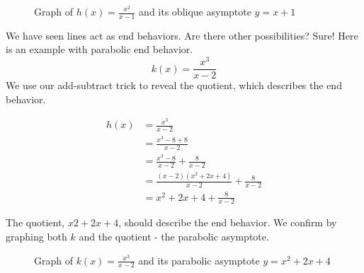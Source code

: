 \begin{figure}[htbp]
  \centering
  \caption{Graph of \( h(x) = \frac{x^2}{x - 1} \) and its oblique asymptote \( y = x + 1 \)}
\end{figure}

We have seen lines act as end behaviors. Are there other possibilities? Sure! Here is an example with parabolic end behavior. 
\[ k(x) = \frac{x^3}{x - 2} \]
We use our add-subtract trick to reveal the quotient, which describes the end behavior.

\begin{equation} \label{eq1}
\begin{split}
h(x) & = \frac{x^3}{x - 2} \\
& = \frac{x^3 - 8 + 8}{x - 2} \\ 
& = \frac{x^3 - 8}{x - 2} + \frac{8}{x - 2} \\
& = \frac{(x - 2)(x^2 + 2x + 4)}{x - 2} + \frac{8}{x - 2} \\
& = x^2 + 2x + 4 + \frac{8}{x - 2}
\end{split}
\end{equation}

The quotient, \( x2 + 2x + 4 \), should describe the end behavior. We confirm by graphing both \( k \) and the quotient - the parabolic asymptote.

\begin{figure}[htbp]
  \centering
  \caption{Graph of \( k(x) = \frac{x^3}{x - 2} \) and its parabolic asymptote \( y = x^2 + 2x + 4 \)}
\end{figure}
